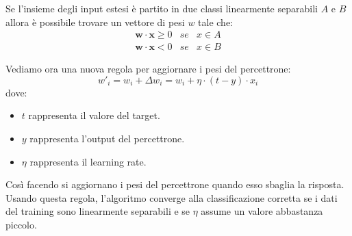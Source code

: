 \begin{teorema}
    Se l'insieme degli input estesi è partito in due classi linearmente separabili $A$ e $B$ allora è possibile trovare un vettore di pesi $w$ tale che:
    \begin{equation}
        \begin{array}{ccc}
            \textbf{w} \cdot \textbf{x} \geq 0 & se & x \in A  \\
            \textbf{w} \cdot \textbf{x} < 0 & se & x \in B
        \end{array}
    \end{equation}
\end{teorema}

Vediamo ora una nuova regola per aggiornare i pesi del percettrone:
\begin{equation}
    w'_i = w_i + \Delta w_i = w_i + \eta \cdot (t - y) \cdot x_i
\end{equation}
dove: \begin{itemize}
    \item $t$ rappresenta il valore del target.
    \item $y$ rappresenta l'output del percettrone.
    \item $\eta$ rappresenta il learning rate.
\end{itemize}

Così facendo si aggiornano i pesi del percettrone quando esso sbaglia la risposta. Usando questa regola, l'algoritmo converge alla classificazione corretta se i dati del training sono linearmente separabili e se $\eta$ assume un valore abbastanza piccolo.
